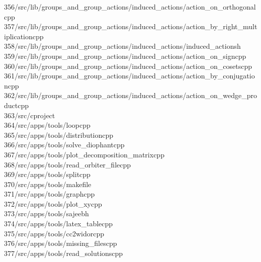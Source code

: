 \begin{tabbing}
356\>/src/lib/groups\_and\_group\_actions/induced\_actions/action\_on\_orthogonalcpp\\[0pt]
357\>/src/lib/groups\_and\_group\_actions/induced\_actions/action\_by\_right\_multiplicationcpp\\[0pt]
358\>/src/lib/groups\_and\_group\_actions/induced\_actions/induced\_actionsh\\[0pt]
359\>/src/lib/groups\_and\_group\_actions/induced\_actions/action\_on\_signcpp\\[0pt]
360\>/src/lib/groups\_and\_group\_actions/induced\_actions/action\_on\_cosetscpp\\[0pt]
361\>/src/lib/groups\_and\_group\_actions/induced\_actions/action\_by\_conjugationcpp\\[0pt]
362\>/src/lib/groups\_and\_group\_actions/induced\_actions/action\_on\_wedge\_productcpp\\[0pt]
363\>/src/cproject\\[0pt]
364\>/src/apps/tools/loopcpp\\[0pt]
365\>/src/apps/tools/distributioncpp\\[0pt]
366\>/src/apps/tools/solve\_diophantcpp\\[0pt]
367\>/src/apps/tools/plot\_decomposition\_matrixcpp\\[0pt]
368\>/src/apps/tools/read\_orbiter\_filecpp\\[0pt]
369\>/src/apps/tools/splitcpp\\[0pt]
370\>/src/apps/tools/makefile\\[0pt]
371\>/src/apps/tools/graphcpp\\[0pt]
372\>/src/apps/tools/plot\_xycpp\\[0pt]
373\>/src/apps/tools/sajeebh\\[0pt]
374\>/src/apps/tools/latex\_tablecpp\\[0pt]
375\>/src/apps/tools/cc2widorcpp\\[0pt]
376\>/src/apps/tools/missing\_filescpp\\[0pt]
377\>/src/apps/tools/read\_solutionscpp\\[0pt]

\end{tabbing}
